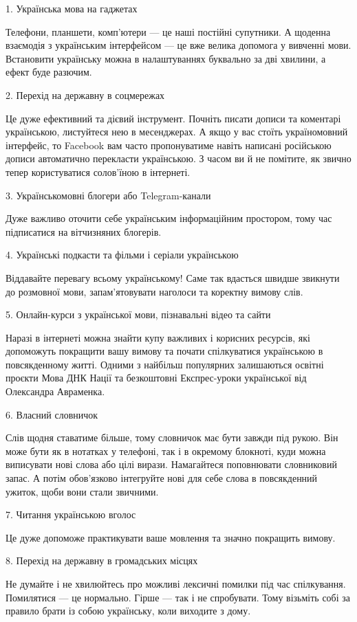 1. Українська мова на гаджетах

Телефони, планшети, комп'ютери — це наші постійні супутники. А щоденна
взаємодія з українським інтерфейсом — це вже велика допомога у вивченні мови.
Встановити українську можна в налаштуваннях буквально за дві хвилини, а ефект
буде разючим.  

2. Перехід на державну в соцмережах

Це дуже ефективний та дієвий інструмент. Почніть писати дописи та коментарі
українською, листуйтеся нею в месенджерах. А якщо у вас стоїть україномовний
інтерфейс, то Facebook вам часто пропонуватиме навіть написані російською
дописи автоматично перекласти українською. З часом ви й не помітите, як звично
тепер користуватися солов'їною в інтернеті.  

3. Українськомовні блогери або Telegram-канали

Дуже важливо оточити себе українським інформаційним простором, тому час
підписатися на вітчизняних блогерів.

4. Українські подкасти та фільми і серіали українською

Віддавайте перевагу всьому українському! Саме так вдасться швидше звикнути до
розмовної мови, запам'ятовувати наголоси та коректну вимову слів.

5. Онлайн-курси з української мови, пізнавальні відео та сайти

Наразі в інтернеті можна знайти купу важливих і корисних ресурсів, які
допоможуть покращити вашу вимову та почати спілкуватися українською в
повсякденному житті. Одними з найбільш популярних залишаються освітні проєкти
Мова ДНК Нації та безкоштовні Експрес-уроки української від Олександра
Авраменка.

6. Власний словничок

Слів щодня ставатиме більше, тому словничок має бути завжди під рукою. Він може
бути як в нотатках у телефоні, так і в окремому блокноті, куди можна виписувати
нові слова або цілі вирази. Намагайтеся поповнювати словниковий запас. А потім
обов'язково інтегруйте нові для себе слова в повсякденний ужиток, щоби вони
стали звичними.

7. Читання українською вголос

Це дуже допоможе практикувати ваше мовлення та значно покращить вимову.

8. Перехід на державну в громадських місцях

Не думайте і не хвилюйтесь про можливі лексичні помилки під час спілкування.
Помилятися — це нормально. Гірше — так і не спробувати. Тому візьміть собі за
правило брати із собою українську, коли виходите з дому.

